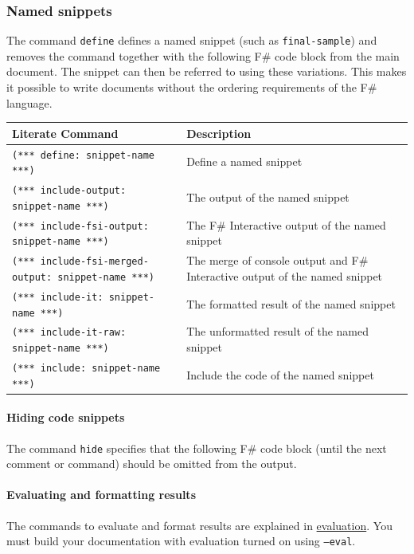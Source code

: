 \documentclass{article}
\begin{document}
\subsubsection*{Named snippets}



The command \texttt{define} defines a named snippet (such as \texttt{final-sample}) and removes the command together with
the following F\# code block from the main document. The snippet can then
be referred to using these variations. This makes it
possible to write documents without the ordering requirements of the
F\# language.
\begin{tabular}{|l|l|}\hline
\textbf{Literate Command} & \textbf{Description}\\ \hline\hline
\texttt{(*** define: snippet-name ***)} & Define a named snippet\\ \hline
\texttt{(*** include-output: snippet-name ***)} & The output of the named snippet\\ \hline
\texttt{(*** include-fsi-output: snippet-name ***)} & The F\# Interactive output of the named snippet\\ \hline
\texttt{(*** include-fsi-merged-output: snippet-name ***)} & The merge of console output and F\# Interactive output of the named snippet\\ \hline
\texttt{(*** include-it: snippet-name ***)} & The formatted result of the named snippet\\ \hline
\texttt{(*** include-it-raw: snippet-name ***)} & The unformatted result of the named snippet\\ \hline
\texttt{(*** include: snippet-name ***)} & Include the code of the named snippet\\ \hline
\end{tabular}

\paragraph{Hiding code snippets}



The command \texttt{hide} specifies that the following F\# code block (until the next comment or command) should be
omitted from the output.
\paragraph{Evaluating and formatting results}



The commands to evaluate and format results are explained in \href{evaluation.html}{evaluation}.
You must build your documentation with evaluation turned on using \texttt{--eval}.
\end{document}

